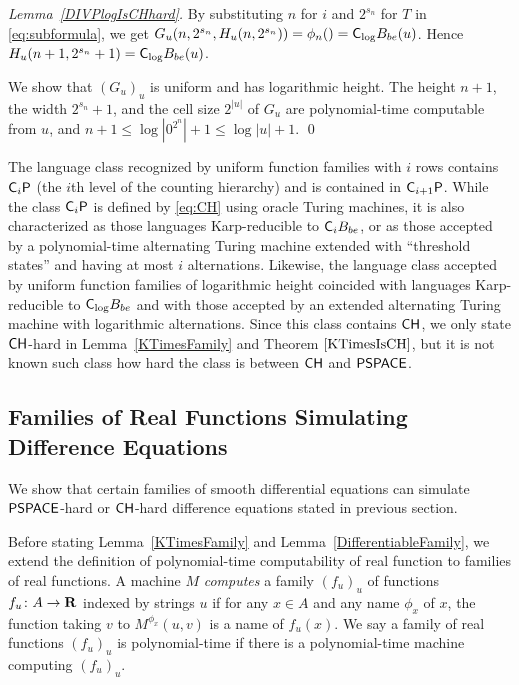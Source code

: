\begin{proof}[Lemma~\ref{DIVPlogIsCHhard}]
By substituting $n$ for $i$ and $2^{s_n}$ for $T$ in \eqref{eq:subformula},
we get $G_u(n, 2^{s_n}, H_u(n,2^{s_n})) = \phi_n() = \mathsf{C}_{\log} B_{be}(u)$.
Hence $H_u(n+1, 2^{s_n}+1) = \mathsf{C}_{\log} B_{be}(u)$.
 
We show that $(G_u)_u$ is uniform and has logarithmic height. 
The height $n+1$, the width $2^{s_n}+1$, and the cell size $2^{|u|}$
of $G_u$ are polynomial-time computable from $u$, 
and $n+1 \le \log |0^{2^n}| + 1 \le \log|u| + 1$.
\qed
\end{proof}


The language class recognized by uniform function families with $i$ rows
contains $\mathsf{C}_i \mathsf{P}$ (the $i$th level of the counting hierarchy)
and is contained in $\mathsf{C}_{i+1} \mathsf{P}$.
While the class $\mathsf{C}_i \mathsf{P}$ is defined by \eqref{eq:CH} using oracle Turing machines,
it is also characterized as those languages Karp-reducible to $\mathsf{C}_i B_{be}$, or 
as those accepted by a polynomial-time alternating Turing machine 
extended with ``threshold states'' and having at most $i$ alternations.
Likewise, 
the language class accepted by uniform function families of logarithmic height
coincided with languages Karp-reducible to $\mathsf{C}_{\log} B_{be}$
and with those accepted by an extended alternating Turing machine with logarithmic alternations.
Since this class contains $\mathsf{CH}$,
we only state $\mathsf{CH}$-hard in Lemma~\ref{KTimesFamily} and Theorem $\ref{KTimesIsCH}$,
but it is not known such class how hard the class is between $\mathsf{CH}$ and $\mathsf{PSPACE}$.



\subsection{Families of Real Functions Simulating Difference Equations}
\label{subsection: ode family}
We show that certain families of smooth differential equations can simulate 
$\mathsf{PSPACE}$-hard or $\mathsf{CH}$-hard difference equations stated in previous section.

Before stating Lemma~\ref{KTimesFamily} and Lemma~\ref{DifferentiableFamily},
we extend the definition of polynomial-time computability of real function
to families of real functions.
A machine $M$ \emph{computes} a family $(f_u)_u$ of functions $f _u \colon A \to \mathbf R$ 
indexed by strings $u$
if for any $x \in A$ and any name $\phi_x$ of $x$,
the function taking $v$ to $M ^{\phi _x} (u, v)$ is a name of $f _u (x)$.
We say a family of real functions $(f_u)_u$ is polynomial-time if there is
a polynomial-time machine computing $(f_u)_u$.


